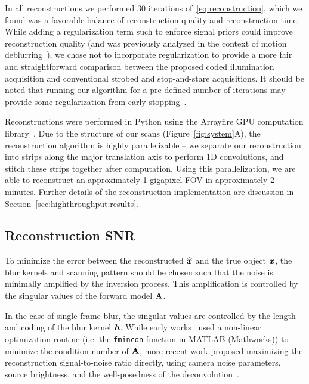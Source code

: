 In all reconstructions we performed 30 iterations of~\eqref{eq:reconstruction}, which we found was a favorable balance of reconstruction quality and reconstruction time. While adding a regularization term such to enforce signal priors could improve reconstruction quality (and was previously analyzed in the context of motion deblurring~\cite{mitra:2014}), we chose not to incorporate regularization to provide a more fair and straightforward comparison between the proposed coded illumination acquisition and conventional strobed and stop-and-stare acquisitions. It should be noted that running our algorithm for a pre-defined number of iterations may provide some regularization from early-stopping~\cite{hagiwara2000regularization}.

Reconstructions were performed in Python using the Arrayfire GPU computation library~\cite{Yalamanchili2015}. 
Due to the structure of our scans (Figure~\ref{fig:system}A), the reconstruction algorithm is highly parallelizable -- we separate our reconstruction into strips along the major translation axis to perform 1D convolutions, and stitch these strips together after computation. 
Using this parallelization, we are able to reconstruct an approximately 1 gigapixel FOV in approximately 2 minutes. Further details of the reconstruction implementation are discussion in Section~\ref{sec:highthroughput:results}.

\subsection{Reconstruction SNR}\label{sec:highthroughput:methods_snr}

To minimize the error between the reconstructed $\widehat {\bm{x}}$ and the true object $\bm{x}$, the blur kernels and scanning pattern should be chosen such that the noise is minimally amplified by the inversion process. This amplification is controlled by the singular values of the forward model $\mathbf{A}$. 

In the case of single-frame blur, the singular values are controlled by the length and coding of the blur kernel $\bm{h}$. 
While early works~\cite{raskar2006coded, Ma:15} used a non-linear optimization routine (i.e. the \texttt{fmincon} function in MATLAB (Mathworks)) to minimize the condition number of $\mathbf{A}$, more recent work proposed maximizing the reconstruction signal-to-noise ratio directly, using camera noise parameters, source brightness, and the well-posedness of the deconvolution~\cite{agrawal2009optimal, cossairt2013does}. 

